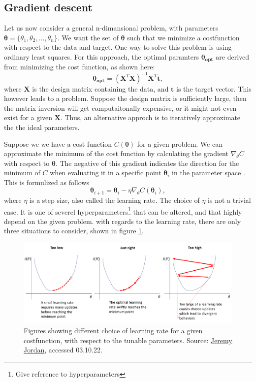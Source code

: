 \subsection*{Gradient descent}
Let us now consider a general n-dimansional problem, with parameters $\boldsymbol{\theta} = \{\theta_1, \theta_2, ..., \theta_n\}$. We want the set of $\boldsymbol{\theta}$
such that we minimize a costfunction with respect to the data and target. One way to solve this problem is using ordinary least squares. For this approach, 
the optimal paramters $\boldsymbol{\theta_{opt}}$ are derived from minimizing the cost function, as shown here:
\begin{equation*}
    \boldsymbol{\theta_{opt}} = (\boldsymbol{X}^T\boldsymbol{X})^{-1}\boldsymbol{X}^T\boldsymbol{t},
\end{equation*}
where $\boldsymbol{X}$ is the design matrix containing the data, and $\boldsymbol{t}$ is the target vector. This however leads to a problem. Suppose the design matrix is sufficiently large,
then the matrix inversion will get computaitonally expensive, or it might not even exist for a given $\boldsymbol{X}$. Thus, an alternative approch is to iteratively approximate the the ideal 
parameters. \par 
Suppose we we have a cost function $C(\boldsymbol{\theta})$ for a given problem. We can approximate the minimum of the cost function by calculating
the gradient $\nabla_{\theta}C$ with respect to $\boldsymbol{\theta}$. The negative of this gradient indicates the direction for the minimum of $C$ when evaluating 
it in a specific point $\boldsymbol{\theta}_i$ in the parameter space \cite{FYSSTK}. This is formulized as follows 
\begin{equation}
    \boldsymbol{\theta}_{i+1} = \boldsymbol{\theta}_i - \eta\nabla_{\theta}C(\boldsymbol{\theta}_i),
\end{equation}
where $\eta$ is a step size, also called the learning rate. The choice of $\eta$ is not a trivial case. It is one of severel 
hyperparameters\footnote{Give reference to hyperparameters}
that can be altered, and that highly depend on the given problem. with regards to the learning rate, there are only three situations to consider, shown in figure \ref{fig:lr_choice}.
\begin{figure}
    \includegraphics[width=\linewidth]{Figures/Machinelearning/lr_choice.png}
    \caption{Figures showing different choice of learning rate for a given costfunction, with respect to the tunable parameters. 
    Source: \href{https://www.jeremyjordan.me/content/images/2018/02/Screen-Shot-2018-02-24-at-11.47.09-AM.png}{Jeremy Jordan}, accessed 03.10.22.}
    \label{fig:lr_choice}
\end{figure}

